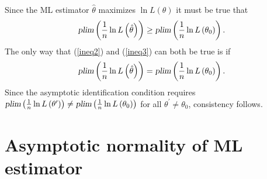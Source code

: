 \documentclass{article}
\begin{document}
Since the ML estimator $\hat{\theta}$ maximizes $\ln L\left( \theta \right) $
it must be true that%
\begin{equation}
\textsl{plim}\left( \frac{1}{n}\ln L\left( \hat{\theta}\right) \right) \geq
\textsl{plim}\left( \frac{1}{n}\ln L\left( \theta _{0}\right) \right) .
\label{ineq3}
\end{equation}%
The only way that (\ref{ineq2}) and (\ref{ineq3}) can both be true is if%
\begin{equation*}
\textsl{plim}\left( \frac{1}{n}\ln L\left( \hat{\theta}\right) \right) =%
\textsl{plim}\left( \frac{1}{n}\ln L\left( \theta _{0}\right) \right) .
\end{equation*}%
Since the asymptotic identification condition requires $\textsl{plim}\left(
\frac{1}{n}\ln L\left( \theta ^{\prime }\right) \right) \neq \textsl{plim}%
\left( \frac{1}{n}\ln L\left( \theta _{0}\right) \right) $ for all $\theta
^{\prime }\neq \theta _{0}$, consistency follows.

\section{Asymptotic normality of ML estimator}
\end{document}
